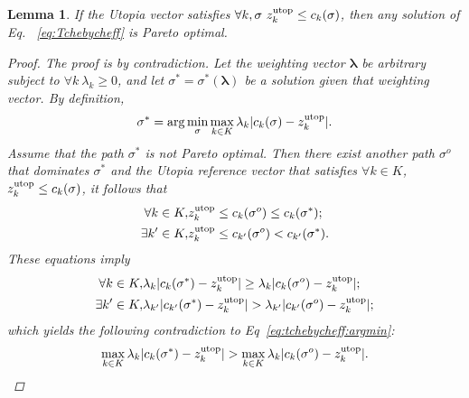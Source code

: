 \documentclass{article}
\newtheorem{lem}{Lemma}
\begin{document}
\begin{lem}
\label{lem:sol_pareto_opt}
If the Utopia vector satisfies $\forall k,\sigma\  z_k^{\rm utop}\leq c_{k}( \sigma)$, then any solution of Eq.~ \eqref{eq:Tchebycheff} is Pareto optimal.
\begin{proof}
The proof is by contradiction.  
Let the weighting vector ${\mathbf \lambda}$ be arbitrary subject to $\forall k\ \lambda_k\geq 0$, and let $ \sigma^*=\sigma^{*}({\mathbf \lambda}) $ be a solution given that weighting vector. 
By definition, 
\begin{equation}
\label{eq:tchebycheff:argmin}
\sigma^{*} = \arg \min_{ \sigma } \max_{ k \in K }  \lambda_{k} | c_{k}( \sigma ) - z^{\rm utop}_{k} | .
\end{equation}
Assume that the path $ \sigma^{*} $ is not Pareto optimal.
Then there exist another path $ \sigma^{o} $ that dominates $ \sigma^{*} $
and the Utopia reference vector that satisfies
$ \forall k \in K $, $ z^{\rm utop}_{k} \leq  c_{k}( \sigma ) $, it follows that
\begin{eqnarray}
\nonumber
\forall k \in K , & z^{\rm utop}_{k} \leq c_{k}( \sigma^{o} ) \leq c_{k}( \sigma^{*} ) ; \\
\nonumber
\exists k' \in K , & z^{\rm utop}_{k} \leq c_{k'}( \sigma^{o} ) < c_{k'}( \sigma^{*} ).
\end{eqnarray}
These equations imply
\begin{eqnarray}
\nonumber
\forall k \in K , & \lambda_{k} | c_{k}( \sigma^{*} ) - z^{\rm utop}_{k} | \geq \lambda_{k}  | c_{k}( \sigma^{o} ) - z^{\rm utop}_{k} | ; \\
\nonumber
\exists k' \in K , & \lambda_{k'}  | c_{k'}( \sigma^{*} ) - z^{\rm utop}_{k} | > \lambda_{k'}  | c_{k'}( \sigma^{o} ) - z^{\rm utop}_{k} | ;
\end{eqnarray}
which yields the following contradiction to Eq~\eqref{eq:tchebycheff:argmin}:
\begin{equation}
\nonumber
\max_{ k \in K }  \lambda_{k} | c_{k}( \sigma^{*} ) - z^{\rm utop}_{k} | > \max_{ k \in K } \lambda_{k}  | c_{k}( \sigma^{o} ) - z^{\rm utop}_{k} |.
\end{equation}
\end{proof}
\end{lem}
\end{document}
